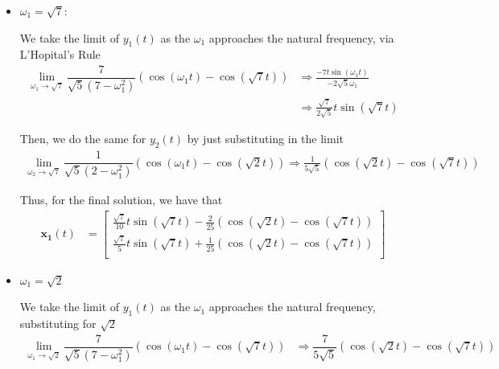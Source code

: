 \documentclass[12pt]{article}
\begin{document}
\begin{itemize}
    \item $\omega_1 = {\sqrt{7}}$:

          We take the limit of $y_1(t)$ as the $\omega_1$ approaches the natural frequency, via L'Hopital's Rule
          \begin{align*}
              \lim_{\omega_1 \rightarrow{} \sqrt{7}}  \dfrac{7}{\sqrt{5}(7-\omega_1^2)}(\cos(\omega_{1}t) -\cos(\sqrt{7}t)) & \Rightarrow{} \frac{-7t \sin(\omega_1t)}{-2\sqrt{5}\omega_1} \\
                                                                                                                            & \Rightarrow{}  \frac{\sqrt{7}}{2\sqrt{5}} t\sin{(\sqrt{7}t)}
          \end{align*}

          Then, we do the same for $y_2(t)$ by just substituting in the limit
          \begin{align*}
              \lim_{\omega_2 \rightarrow{} \sqrt{7}} \dfrac{1}{\sqrt{5}(2-\omega_1^2)}(\cos(\omega_{1}t) -\cos(\sqrt{2}t)) \Rightarrow{} \frac{1}{5\sqrt{5}} (\cos(\sqrt{2}t) -\cos(\sqrt{7}t))
          \end{align*}

          Thus, for the final solution, we have that
          \begin{align*}
              \mathbf{x_1}(t) & = \begin{bmatrix}
                                      \frac{\sqrt{7}}{10} t\sin{(\sqrt{7}t)} - \frac{2}{25} (\cos(\sqrt{2}t) -\cos(\sqrt{7}t)) \\
                                      \frac{\sqrt{7}}{5} t\sin{(\sqrt{7}t)} + \frac{1}{25} (\cos(\sqrt{2}t) -\cos(\sqrt{7}t))  \\
                                  \end{bmatrix}
          \end{align*}

    \item $\omega_1 = \sqrt{2}$

          We take the limit of $y_1(t)$ as the $\omega_1$ approaches the natural frequency, substituting for $\sqrt{2}$
          \begin{align*}
              \lim_{\omega_1 \rightarrow{} \sqrt{2}}  \dfrac{7}{\sqrt{5}(7-\omega_1^2)}(\cos(\omega_{1}t) -\cos(\sqrt{7}t)) & \Rightarrow{} \dfrac{7}{5\sqrt{5}}(\cos(\sqrt{2}t) -\cos(\sqrt{7}t))
          \end{align*}


\end{itemize}
\end{document}
